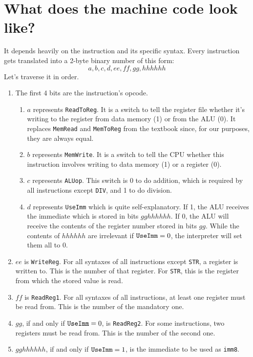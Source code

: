\documentclass[12pt, oneside]{memoir}
\newcommand{\imm}{{\color{imm}\texttt{imm8}}}
\newcommand{\instruction}[1]{{\color{instruction}\texttt{#1}}}
\begin{document}
\section{What does the machine code look like?}
It depends heavily on the instruction and its specific syntax. Every instruction gets translated into a 2-byte binary number of this form:
\begin{equation*}
    a,b,c,d,ee,ff,gg,hhhhhh
\end{equation*}
Let's traverse it in order.
\begin{enumerate}
    \item The first 4 bits are the instruction's opcode.
    \begin{enumerate}
    \item$a$ represents \texttt{ReadToReg}. It is a switch to tell the register file whether it's writing to the register from data memory (1) or from the ALU (0). It replaces \texttt{MemRead} and \texttt{MemToReg} from the textbook since, for our purposes, they are always equal.
    \item $b$ represents \texttt{MemWrite}. It is a switch to tell the CPU whether this instruction involves writing to data memory (1) or a register (0).
    \item $c$ represents \texttt{ALUop}. This switch is 0 to do addition, which is required by all instructions except \instruction{DIV}, and 1 to do division.
    \item $d$ represents \texttt{UseImm} which is quite self-explanatory. If 1, the ALU receives the immediate which is stored in bits $gghhhhhh$. 
    If 0, the ALU will receive the contents of the register number stored in bits $gg$. While the contents of $hhhhhh$ are irrelevant if $\text{\texttt{UseImm}} = 0$, the interpreter will set them all to 0.
    \end{enumerate}
    \item $ee$ is \texttt{WriteReg}. For all syntaxes of all instructions except \instruction{STR}, a register is written to. This is the number of that register. For \instruction{STR}, this is the register from which the stored value is read.
    \item $ff$ is \texttt{ReadReg1}. For all syntaxes of all instructions, at least one register must be read from. This is the number of the mandatory one.
    \item $gg$, if and only if $\text{\texttt{UseImm}} = 0$, is \texttt{ReadReg2}. For some instructions, two registers must be read from. This is the number of the second one.
    \item $gghhhhhh$, if and only if $\text{\texttt{UseImm}} = 1$, is the immediate to be used as \imm.
\end{enumerate}
\end{document}
